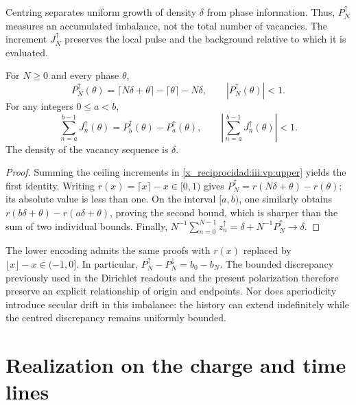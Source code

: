 Centring separates uniform growth of density $\delta$ from
phase information. Thus, $P_N^{\uparrow}$ measures an accumulated imbalance,
not the total number of vacancies. The increment $J_N^{\uparrow}$ preserves
the local pulse and the background relative to which it is evaluated.

\begin{theorem}
For $N\geq0$ and every phase $\theta$,
\begin{equation}
 P_N^{\uparrow}(\theta)
 =\lceil N\delta+\theta\rceil-\lceil\theta\rceil-N\delta,
 \qquad |P_N^{\uparrow}(\theta)|<1.
 \label{x_reciprocidad:iii:vp:bound}
\end{equation}
For any integers $0\leq a<b$,
\begin{equation}
 \sum_{n=a}^{b-1}J_n^{\uparrow}(\theta)
 =P_b^{\uparrow}(\theta)-P_a^{\uparrow}(\theta),
 \qquad
 \left|\sum_{n=a}^{b-1}J_n^{\uparrow}(\theta)\right|<1.
 \label{x_reciprocidad:iii:vp:continuity}
\end{equation}
The density of the vacancy sequence is $\delta$.
\end{theorem}
\begin{proof}
Summing the ceiling increments in \eqref{x_reciprocidad:iii:vp:upper} yields the
first identity. Writing $r(x)=\lceil x\rceil-x\in[0,1)$
gives $P_N^{\uparrow}=r(N\delta+\theta)-r(\theta)$; its absolute
value is less than one. On the interval $[a,b)$, one similarly obtains
$r(b\delta+\theta)-r(a\delta+\theta)$, proving
the second bound, which is sharper than the sum of two individual bounds.
Finally,
$N^{-1}\sum_{n=0}^{N-1}z_n^{\uparrow}
=\delta+N^{-1}P_N^{\uparrow}\to\delta$.
\end{proof}

The lower encoding admits the same proofs with
$r(x)$ replaced by $\lfloor x\rfloor-x\in(-1,0]$. In particular,
$P_N^{\uparrow}-P_N^{\downarrow}=b_0-b_N$. The bounded discrepancy
previously used in the Dirichlet readouts and the present polarization
therefore preserve an explicit relationship of origin and endpoints.
Nor does aperiodicity introduce secular drift in this imbalance:
the history can extend indefinitely while the centred discrepancy
remains uniformly bounded.

\section{Realization on the charge and time lines}

